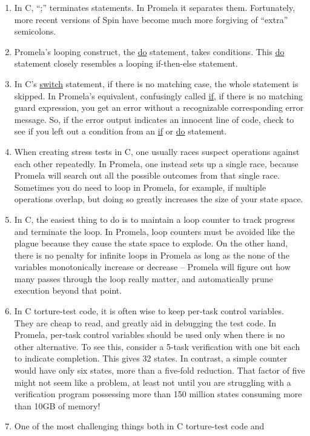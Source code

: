 \begin{enumerate}
\item	In C, ``\url{;}'' terminates statements.  In Promela it separates them.
	Fortunately, more recent versions of Spin have become
	much more forgiving of ``extra'' semicolons.
\item	Promela's looping construct, the \url{do} statement, takes
	conditions.
	This \url{do} statement closely resembles a looping if-then-else
	statement.
\item	In C's \url{switch} statement, if there is no matching case, the whole
	statement is skipped.  In Promela's equivalent, confusingly called
	\url{if}, if there is no matching guard expression, you get an error
	without a recognizable corresponding error message.
	So, if the error output indicates an innocent line of code,
	check to see if you left out a condition from an \url{if} or \url{do}
	statement.
\item	When creating stress tests in C, one usually races suspect operations
	against each other repeatedly.	In Promela, one instead sets up
	a single race, because Promela will search out all the possible
	outcomes from that single race.	Sometimes you do need to loop
	in Promela, for example, if multiple operations overlap, but
	doing so greatly increases the size of your state space.
\item	In C, the easiest thing to do is to maintain a loop counter to track
	progress and terminate the loop.  In Promela, loop counters
	must be avoided like the plague because they cause the state
	space to explode.  On the other hand, there is no penalty for
	infinite loops in Promela as long as the none of the variables
	monotonically increase or decrease -- Promela will figure out
	how many passes through the loop really matter, and automatically
	prune execution beyond that point.
\item	In C torture-test code, it is often wise to keep per-task control
	variables.  They are cheap to read, and greatly aid in debugging the
	test code.  In Promela, per-task control variables should be used
	only when there is no other alternative.  To see this, consider
	a 5-task verification with one bit each to indicate completion.
	This gives 32 states.  In contrast, a simple counter would have
	only six states, more than a five-fold reduction.  That factor
	of five might not seem like a problem, at least not until you
	are struggling with a verification program possessing more than
	150 million states consuming more than 10GB of memory!
\item	One of the most challenging things both in C torture-test code and

\end{enumerate}

